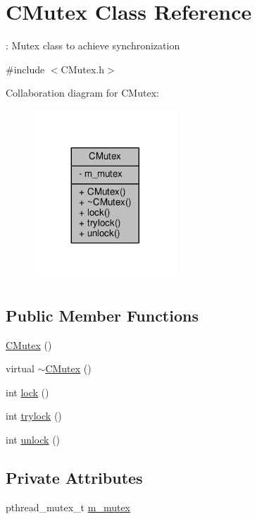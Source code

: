 \hypertarget{classCMutex}{\section{C\-Mutex Class Reference}
\label{classCMutex}
}


\-: Mutex class to achieve synchronization  




{\ttfamily \#include $<$C\-Mutex.\-h$>$}



Collaboration diagram for C\-Mutex\-:
\nopagebreak
\begin{figure}[H]
\begin{center}
\leavevmode
\includegraphics[width=152pt]{d4/db7/classCMutex__coll__graph}
\end{center}
\end{figure}
\subsection*{Public Member Functions}
\begin{DoxyCompactItemize}
\item 
\hyperlink{classCMutex_a9c050f1451600e8bc35c4c80f6533800}{C\-Mutex} ()
\item 
virtual \hyperlink{classCMutex_a59780a1a2a0e85377886c08e91817048}{$\sim$\-C\-Mutex} ()
\item 
int \hyperlink{classCMutex_a9ef2455d929bb4bd9dd458a35c8bc9a6}{lock} ()
\item 
int \hyperlink{classCMutex_a6d7acb0de2dc55a1fc765055772c132d}{trylock} ()
\item 
int \hyperlink{classCMutex_a98da3b28764101df37a6f3935066a149}{unlock} ()
\end{DoxyCompactItemize}
\subsection*{Private Attributes}
\begin{DoxyCompactItemize}
\item 
pthread\-\_\-mutex\-\_\-t \hyperlink{classCMutex_a0e47869fa098e329321e674647732b4d}{m\-\_\-mutex}
\end{DoxyCompactItemize}


